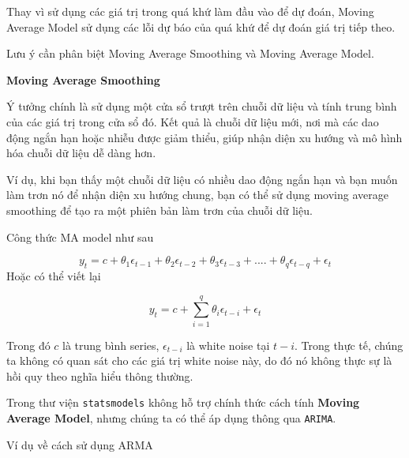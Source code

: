 \documentclass[
]{book}
\renewenvironment{quote}{\begin{VF}}{\end{VF}}
\begin{document}
Thay vì sử dụng các giá trị trong quá khứ làm đầu vào để dự đoán, Moving Average Model sử dụng các lỗi dự báo của quá khứ để dự đoán giá trị tiếp theo.

Lưu ý cần phân biệt Moving Average Smoothing và Moving Average Model.

\textbf{Moving Average Smoothing}

\begin{quote}
Ý tưởng chính là sử dụng một cửa sổ trượt trên chuỗi dữ liệu và tính trung bình của các giá trị trong cửa sổ đó. Kết quả là chuỗi dữ liệu mới, nơi mà các dao động ngắn hạn hoặc nhiễu được giảm thiểu, giúp nhận diện xu hướng và mô hình hóa chuỗi dữ liệu dễ dàng hơn.
\end{quote}

\begin{quote}
Ví dụ, khi bạn thấy một chuỗi dữ liệu có nhiều dao động ngắn hạn và bạn muốn làm trơn nó để nhận diện xu hướng chung, bạn có thể sử dụng moving average smoothing để tạo ra một phiên bản làm trơn của chuỗi dữ liệu.
\end{quote}

Công thức MA model như sau

\[
y_t = c + \theta_1 \epsilon_{t-1} + \theta_2 \epsilon_{t-2} + \theta_3 \epsilon_{t-3} + .... + \theta_q \epsilon_{t-q} + \epsilon_t 
\]
Hoặc có thể viết lại

\[
y_t = c  + \sum^{q}_{i=1}\theta_{i}\epsilon_{t-i} +  \epsilon_t
\]

Trong đó \(c\) là trung bình series, \(\epsilon_{t-i}\) là white noise tại \(t-i\). Trong thực tế, chúng ta không có quan sát cho các giá trị white noise này, do đó nó không thực sự là hồi quy theo nghĩa hiểu thông thường.

Trong thư viện \texttt{statsmodels} không hỗ trợ chính thức cách tính \textbf{Moving Average Model}, nhưng chúng ta có thể áp dụng thông qua \texttt{ARIMA}.

Ví dụ về cách sử dụng ARMA
\end{document}
